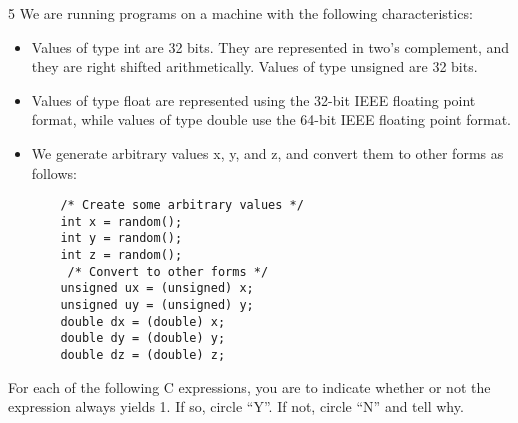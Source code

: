 \documentclass[12pt,a4paper]{article}
\newenvironment{problems}{\begin{list}{}{\renewcommand{\makelabel}[1]{\textbf{##1}.\hfil}}}{\end{list}}
\begin{document}
\begin{problems}
    \item[5] We are running programs on a machine with the following characteristics:
    \begin{itemize}
        \item  Values of type int are 32 bits. They are represented in two’s complement, and they are right shifted arithmetically. Values of type unsigned are 32 bits.
        \item Values of type float are represented using the 32-bit IEEE ﬂoating point format, while values of type double use the 64-bit IEEE ﬂoating point format.
        \item We generate arbitrary values x, y, and z, and convert them to other forms as follows:
        \begin{verbatim}
    /* Create some arbitrary values */ 
    int x = random();
    int y = random();
    int z = random();
     /* Convert to other forms */ 
    unsigned ux = (unsigned) x; 
    unsigned uy = (unsigned) y; 
    double dx = (double) x;
    double dy = (double) y;
    double dz = (double) z;
        \end{verbatim}
    \end{itemize}

    For each of the following C expressions, you are to indicate whether or not the expression always yields 1. If so, circle ``Y''. If not, circle ``N'' and tell why. 
     

\end{problems}
\end{document}
